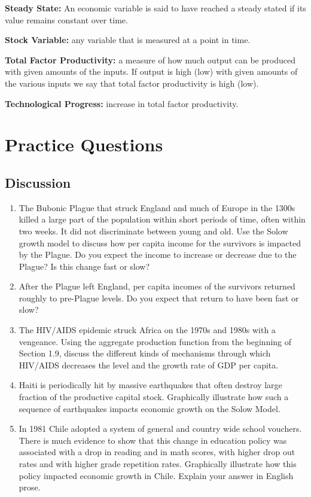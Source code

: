\documentclass[
]{book}
\providecommand{\tightlist}{%
  \setlength{\itemsep}{0pt}\setlength{\parskip}{0pt}}
\begin{document}
\textbf{Steady State:} An economic variable is said to have reached a steady stated if its value remains constant over time.

\textbf{Stock Variable:} any variable that is measured at a point in time.

\textbf{Total Factor Productivity:} a measure of how much output can be produced with given amounts of the inputs. If output is high (low) with given amounts of the various inputs we say that total factor productivity is high (low).

\textbf{Technological Progress:} increase in total factor productivity.

\hypertarget{practice-questions-1}{%
\section{Practice Questions}\label{practice-questions-1}}

\hypertarget{discussion-1}{%
\subsection{Discussion}\label{discussion-1}}

\begin{enumerate}
\def\labelenumi{\arabic{enumi}.}
\tightlist
\item
  The Bubonic Plague that struck England and much of Europe in the 1300s killed a large part of the population within short periods of time, often within two weeks. It did not discriminate between young and old. Use the Solow growth model to discuss how per capita income for the survivors is impacted by the Plague. Do you expect the income to increase or decrease due to the Plague? Is this change fast or slow?
\item
  After the Plague left England, per capita incomes of the survivors returned roughly to pre-Plague levels. Do you expect that return to have been fast or slow?
\item
  The HIV/AIDS epidemic struck Africa on the 1970s and 1980s with a vengeance. Using the aggregate production function from the beginning of Section 1.9, discuss the different kinds of mechanisms through which HIV/AIDS decreases the level and the growth rate of GDP per capita.
\item
  Haiti is periodically hit by massive earthquakes that often destroy large fraction of the productive capital stock. Graphically illustrate how such a sequence of earthquakes impacts economic growth on the Solow Model.
\item
  In 1981 Chile adopted a system of general and country wide school vouchers. There is much evidence to show that this change in education policy was associated with a drop in reading and in math scores, with higher drop out rates and with higher grade repetition rates. Graphically illustrate how this policy impacted economic growth in Chile. Explain your answer in English prose.
\end{enumerate}
\end{document}
